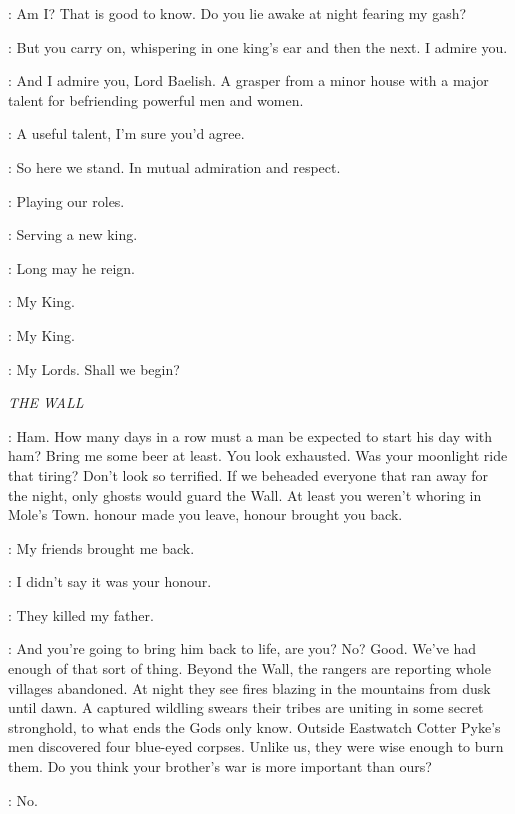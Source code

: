 \VARYS: Am I? That is good to know. Do you lie awake at night fearing my gash? 

\LITTLEFINGER: But you carry on, whispering in one king's ear and then the next. I admire you. 

\VARYS: And I admire you, Lord Baelish. A grasper from a minor house with a major talent for befriending powerful men and women. 

\LITTLEFINGER: A useful talent, I'm sure you'd agree. 

\VARYS: So here we stand. In mutual admiration and respect. 

\LITTLEFINGER: Playing our roles. 

\VARYS: Serving a new king. 

\LITTLEFINGER: Long may he reign. 


\LITTLEFINGER: My King. 

\VARYS: My King. 

\JOFFREY: My Lords. Shall we begin? 



\scene

\textit{THE WALL}


\JEOR: Ham. How many days in a row must a man be expected to start his day with ham? Bring me some beer at least. You look exhausted. Was your moonlight ride that tiring? Don't look so terrified. If we beheaded everyone that ran away for the night, only ghosts would guard the Wall. At least you weren't whoring in Mole's Town. honour made you leave, honour brought you back. 

\JON: My friends brought me back. 

\JEOR: I didn't say it was your honour. 

\JON: They killed my father. 

\JEOR: And you're going to bring him back to life, are you? No? Good. We've had enough of that sort of thing. Beyond the Wall, the rangers are reporting whole villages abandoned. At night they see fires blazing in the mountains from dusk until dawn. A captured wildling swears their tribes are uniting in some secret stronghold, to what ends the Gods only know. Outside Eastwatch Cotter Pyke's men discovered four blue-eyed corpses. Unlike us, they were wise enough to burn them. Do you think your brother's war is more important than ours? 

\JON: No. 

